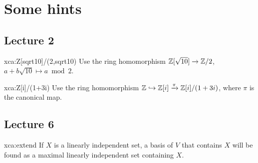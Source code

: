 \chapter*{Some hints}

\section*{Lecture 2}

\begin{sol}{xca:Z[sqrt10]/(2,sqrt10)}
	Use the ring homomorphism $\mathbb{Z}[\sqrt{10}]\to\mathbb{Z}/2$, $a+b\sqrt{10}\mapsto a\bmod 2$. 	
\end{sol}

\begin{sol}{xca:Z[i]/(1+3i)}
	Use the ring homomorphism $\mathbb{Z}\hookrightarrow\mathbb{Z}[i]\xrightarrow{\pi}\mathbb{Z}[i]/(1+3i)$, where
	$\pi$ is the canonical map. 	
\end{sol}

\section*{Lecture 6}

\begin{sol}{xca:extend}
    If $X$ is a linearly independent set, a basis 
    of $V$ that contains $X$ will be found as a maximal linearly independent set 
    containing $X$. 
\end{sol}





